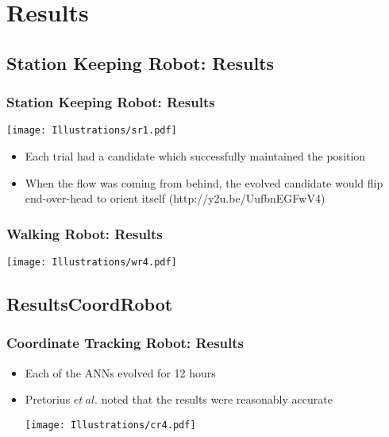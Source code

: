 \documentclass{beamer}
\begin{document}
\section{Results}
\subsection{Station Keeping Robot: Results} %
\begin{frame}
  \frametitle{Station Keeping Robot: Results}
  \begin{center}
  \texttt{[image: Illustrations/sr1.pdf]}
       \\
    \end{center}
  \begin{itemize}
    \item Each trial had a candidate which successfully maintained the position
        \item When the flow was coming from behind, the evolved candidate would flip end-over-head to orient itself (http://y2u.be/UufbnEGFwV4)
  \end{itemize}
\end{frame}

\begin{frame}
  \frametitle{Walking Robot: Results}

\begin{center}
 \texttt{[image: Illustrations/wr4.pdf]}
       \\
\end{center}
\end{frame}

\subsection{ResultsCoordRobot}
\begin{frame}
  \frametitle{Coordinate Tracking Robot: Results}
 \begin{itemize}
 \item Each of the ANNs evolved for 12 hours
 \item Pretorius $et~al.$ noted that the results were reasonably accurate
\begin{center}
 \texttt{[image: Illustrations/cr4.pdf]}
       \\
\end{center}
\end{itemize}
\end{frame}
\end{document}
